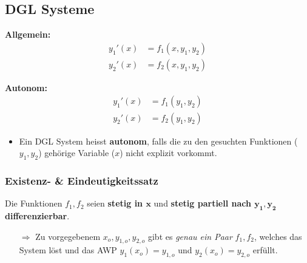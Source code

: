 \subsection{DGL Systeme}
    \vspace{0.5em}
    \begin{minipage}{0.5\linewidth}
        \centering
        \textbf{Allgemein:}
        \begin{align*}
            y_1'(x) &= f_1(x,y_1,y_2)\\
            y_2'(x) &= f_2(x,y_1,y_2)
        \end{align*}
    \end{minipage}
    \begin{minipage}{0.48\linewidth}
        \centering
        \textbf{Autonom:}
        \begin{align*}
            y_1'(x) &= f_1(y_1,y_2)\\
            y_2'(x) &= f_2(y_1,y_2)
        \end{align*}
    \end{minipage}
    \vspace{0.5em}
    \begin{itemize}
        \item Ein DGL System heisst \textbf{autonom}, falls die zu den gesuchten Funktionen ($y_1, y_2$) gehörige Variable ($x$) nicht explizit vorkommt.
    \end{itemize}

    \subsubsection{Existenz- \& Eindeutigkeitssatz}
        Die Funktionen $f_1,f_2$ seien \textbf{stetig in $\boldsymbol{x}$} und \textbf{stetig partiell nach $\boldsymbol{y_1,y_2}$ differenzierbar}.
        \begin{itemize}
            \item[$\Rightarrow$] Zu vorgegebenem $x_o, y_{1,o}, y_{2,o}$ gibt es \textit{genau ein Paar} $f_1,f_2$, welches das System löst und das AWP $y_1(x_o) = y_{1,o}$ und $y_2(x_o) = y_{2,o}$ erfüllt.
        \end{itemize}
